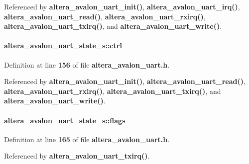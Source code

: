 Referenced by {\bf altera\+\_\+avalon\+\_\+uart\+\_\+init()}, {\bf altera\+\_\+avalon\+\_\+uart\+\_\+irq()}, {\bf altera\+\_\+avalon\+\_\+uart\+\_\+read()}, {\bf altera\+\_\+avalon\+\_\+uart\+\_\+rxirq()}, {\bf altera\+\_\+avalon\+\_\+uart\+\_\+txirq()}, and {\bf altera\+\_\+avalon\+\_\+uart\+\_\+write()}.

\paragraph[{ctrl}]{ altera\+\_\+avalon\+\_\+uart\+\_\+state\+\_\+s\+::ctrl}\label{structaltera__avalon__uart__state__s_a94e72e7a49bc924ec534a66c5943247c}


Definition at line {\bf 156} of file {\bf altera\+\_\+avalon\+\_\+uart.\+h}.



Referenced by {\bf altera\+\_\+avalon\+\_\+uart\+\_\+init()}, {\bf altera\+\_\+avalon\+\_\+uart\+\_\+read()}, {\bf altera\+\_\+avalon\+\_\+uart\+\_\+rxirq()}, {\bf altera\+\_\+avalon\+\_\+uart\+\_\+txirq()}, and {\bf altera\+\_\+avalon\+\_\+uart\+\_\+write()}.

\paragraph[{flags}]{ altera\+\_\+avalon\+\_\+uart\+\_\+state\+\_\+s\+::flags}\label{structaltera__avalon__uart__state__s_ae9cd39f7265e6cc5441dccb871725e09}


Definition at line {\bf 165} of file {\bf altera\+\_\+avalon\+\_\+uart.\+h}.



Referenced by {\bf altera\+\_\+avalon\+\_\+uart\+\_\+txirq()}.

